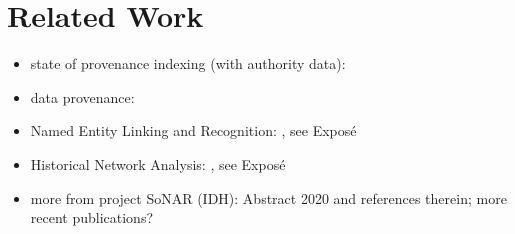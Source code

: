 \chapter{Related Work}
\label{chap:rel_work}


\begin{itemize}
  \item
    state of provenance indexing (with authority data): \autocite{Hakelberg2016}
  \item
    data provenance: \autocite{Eckert2012}
  \item
    Named Entity Linking and Recognition: \autocite{Menzel2021, Meiners2022}, see Exposé
  \item 
    Historical Network Analysis: \autocite{Menzel2020}, see Exposé
  \item
    more from project SoNAR (IDH): Abstract 2020 and references therein; more recent publications?
\end{itemize}